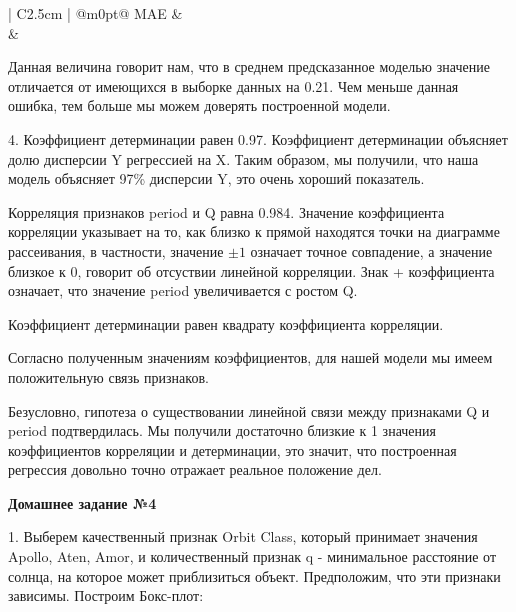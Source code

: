 \documentclass{article}
\begin{document}
\begin{center}
  \begin{tabular}{| C{2.5cm} | @{}m{0pt}@{}}
    \hline
    MAE &\\[0.5em]  &\\[0.5em]   
    \hline
  \end{tabular}
\end{center}

Данная величина говорит нам, что в среднем предсказанное моделью значение отличается от имеющихся в выборке данных на 0.21. Чем меньше данная ошибка, тем больше мы можем доверять построенной модели.

4. Коэффициент детерминации равен 0.97. Коэффициент детерминации объясняет долю дисперсии Y регрессией на X. Таким образом, мы получили, что наша модель объясняет 97\% дисперсии Y, это очень хороший показатель.

Корреляция признаков period и Q равна 0.984. Значение коэффициента корреляции указывает на то, как близко к прямой  находятся точки на диаграмме рассеивания, в частности, значение $\pm 1$ означает точное совпадение, а значение близкое к 0, говорит об отсуствии линейной корреляции. Знак + коэффициента означает, что значение period увеличивается с ростом Q. 

Коэффициент детерминации равен квадрату коэффициента корреляции.

Согласно полученным значениям коэффициентов, для нашей модели мы имеем положительную связь признаков. 

Безусловно, гипотеза о существовании линейной связи между признаками Q и period подтвердилась. Мы получили достаточно близкие к 1 значения коэффициентов корреляции и детерминации, это значит, что построенная регрессия довольно точно отражает реальное положение дел. 

\large \textbf{Домашнее задание №4}

1. Выберем качественный признак Orbit Class, который принимает значения Apollo, Aten, Amor, и количественный признак q - минимальное расстояние от солнца, на которое может приблизиться объект. Предположим, что эти признаки зависимы. Построим Бокс-плот:
\end{document}
